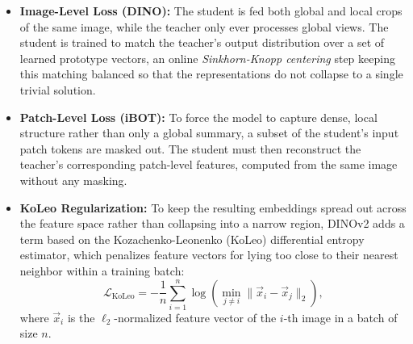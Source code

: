 \begin{itemize}
	\item \textbf{Image-Level Loss (DINO):} The student is fed both global and local crops of the same image, while the teacher only ever processes global views. The student is trained to match the teacher's output distribution over a set of learned prototype vectors, an online \textit{Sinkhorn-Knopp centering} step keeping this matching balanced so that the representations do not collapse to a single trivial solution.
	\item \textbf{Patch-Level Loss (iBOT):} To force the model to capture dense, local structure rather than only a global summary, a subset of the student's input patch tokens are masked out. The student must then reconstruct the teacher's corresponding patch-level features, computed from the same image without any masking.
	\item \textbf{KoLeo Regularization:} To keep the resulting embeddings spread out across the feature space rather than collapsing into a narrow region, DINOv2 adds a term based on the Kozachenko-Leonenko (KoLeo) differential entropy estimator, which penalizes feature vectors for lying too close to their nearest neighbor within a training batch:
	\begin{equation}
		\mathcal{L}_{\text{KoLeo}} = -\frac{1}{n}\sum_{i=1}^{n} \log \left( \min_{j \neq i} \| \vec{x}_i - \vec{x}_j \|_2 \right),
	\end{equation}
	where $\vec{x}_i$ is the $\ell_2$-normalized feature vector of the $i$-th image in a batch of size $n$.
\end{itemize}
